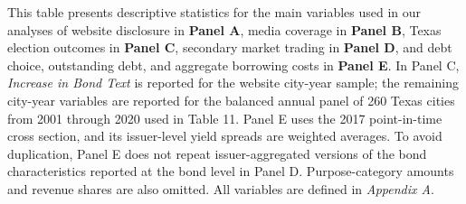\begin{table}[htbp]\centering
\def\sym#1{\ifmmode^{#1}\else\(^{#1}\)\fi}
\caption{\textbf{Descriptive statistics}}
\label{tab:sumstats}
\begingroup
\parbox{\textwidth}{This table presents descriptive statistics for the main variables used in our analyses of website disclosure in \textbf{Panel A}, media coverage in \textbf{Panel B}, Texas election outcomes in \textbf{Panel C}, secondary market trading in \textbf{Panel D}, and debt choice, outstanding debt, and aggregate borrowing costs in \textbf{Panel E}. In Panel C, \textit{Increase in Bond Text} is reported for the website city-year sample; the remaining city-year variables are reported for the balanced annual panel of 260 Texas cities from 2001 through 2020 used in Table 11. Panel E uses the 2017 point-in-time cross section, and its issuer-level yield spreads are weighted averages. To avoid duplication, Panel E does not repeat issuer-aggregated versions of the bond characteristics reported at the bond level in Panel D. Purpose-category amounts and revenue shares are also omitted. All variables are defined in \textit{Appendix A}.}
\vspace{1em}
\endgroup
\end{table}
\vspace{-20pt}
\begingroup
\footnotesize
\setlength{\tabcolsep}{1.5pt}







\endgroup

\begingroup
\scriptsize
\setlength{\tabcolsep}{2pt}

\endgroup

\newpage
